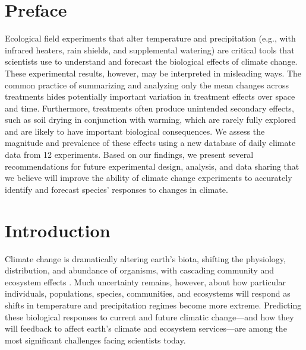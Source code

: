 \documentclass{article}
\begin{document}
\section* {Preface} %
\par Ecological field experiments that alter temperature and precipitation (e.g., with infrared heaters, rain shields, and supplemental watering) are critical tools that scientists use to understand and forecast the biological effects of climate change. These experimental results, however, may be interpreted in misleading ways. The common practice of summarizing and analyzing only the mean changes across treatments hides potentially important variation in treatment effects over space and time. Furthermore, treatments often produce unintended secondary effects, such as soil drying in conjunction with warming, which are rarely fully explored and are likely to have important biological consequences. We assess the magnitude and prevalence of these effects using a new database of daily climate data from 12 experiments. %
Based on our findings, we present several recommendations for future experimental design, analysis, and data sharing that we believe will improve the ability of climate change experiments to accurately identify and forecast species' responses to changes in climate.
\section* {Introduction}
\par Climate change is dramatically altering earth's biota, shifting the physiology, distribution, and abundance of organisms, with cascading community and ecosystem effects \citep{shukla1982,cox2000,thomas2004,parmesan2006,field2007,sheldon2011,urban2012}. Much uncertainty remains, however, about how particular individuals, populations, species, communities, and ecosystems will respond as shifts in temperature and precipitation regimes become more extreme. Predicting these biological responses to current and future climatic change---and how they will feedback to affect earth's climate and ecosystem services---are among the most significant challenges facing scientists today.
\end{document}
